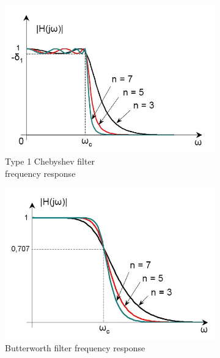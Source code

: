 \begin{figure}[h]
	\centering
	\begin{subfigure}{.3\textwidth}
	  	\centering
	  	\includegraphics[width=1\linewidth]{Figures/chebyshev.jpeg}
	  	\caption{Type 1 Chebyshev filter \\frequency response}
	  	\label{fig:sub1}
	\end{subfigure}
	\hfill
	\begin{subfigure}{.3\textwidth}
	  	\centering
	  	\includegraphics[width=1\linewidth]{Figures/butterworth.jpeg}
	  	\caption{Butterworth filter frequency response}
	  	\label{fig:sub2}
	\end{subfigure}
	\hfill
	\begin{subfigure}{.3\textwidth}
		\centering

\end{subfigure}
\end{figure}

